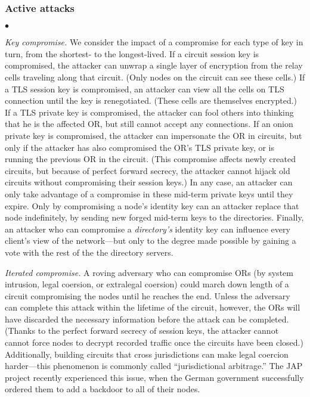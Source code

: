 \documentclass[times,10pt,twocolumn]{article}
\newenvironment{tightlist}{\begin{list}{$\bullet$}{
  \setlength{\itemsep}{0mm}
    \setlength{\parsep}{0mm}
    }}{\end{list}}
\begin{document}
\subsubsection*{Active attacks}
\begin{tightlist}
\item \emph{Key compromise.}  We consider the impact of a compromise
  for each type of key in turn, from the shortest- to the
  longest-lived.  If a circuit session key is compromised, the
  attacker can unwrap a single layer of encryption from the relay
  cells traveling along that circuit.  (Only nodes on the circuit can
  see these cells.)  If a TLS session key is compromised, an attacker
  can view all the cells on TLS connection until the key is
  renegotiated.  (These cells are themselves encrypted.)  If a TLS
  private key is compromised, the attacker can fool others into
  thinking that he is the affected OR, but still cannot accept any
  connections.  If an onion private key is compromised, the attacker
  can impersonate the OR in circuits, but only if the attacker has
  also compromised the OR's TLS private key, or is running the
  previous OR in the circuit.  (This compromise affects newly created
  circuits, but because of perfect forward secrecy, the attacker
  cannot hijack old circuits without compromising their session keys.)
  In any case, an attacker can only take advantage of a compromise in
  these mid-term private keys until they expire.  Only by
  compromising a node's identity key can an attacker replace that
  node indefinitely, by sending new forged mid-term keys to the
  directories.  Finally, an attacker who can compromise a
  \emph{directory's} identity key can influence every client's view
  of the network---but only to the degree made possible by gaining a
  vote with the rest of the the directory servers.

\item \emph{Iterated compromise.} A roving adversary who can
  compromise ORs (by system intrusion, legal coersion, or extralegal
  coersion) could march down length of a circuit compromising the
  nodes until he reaches the end.  Unless the adversary can complete
  this attack within the lifetime of the circuit, however, the ORs
  will have discarded the necessary information before the attack can
  be completed.  (Thanks to the perfect forward secrecy of session
  keys, the attacker cannot cannot force nodes to decrypt recorded
  traffic once the circuits have been closed.)  Additionally, building
  circuits that cross jurisdictions can make legal coercion
  harder---this phenomenon is commonly called ``jurisdictional
  arbitrage.'' The JAP project recently experienced this issue, when
  the German government successfully ordered them to add a backdoor to
  all of their nodes.


\end{tightlist}
\end{document}
